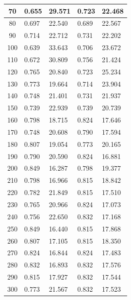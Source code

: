 \documentclass{report}
\begin{document}
\begin{minipage}{\textwidth}
\begin{longtable}{|c|l|l|l|l|}
                     70 & 0.655 & 29.571 & 0.723 & 22.468 \\ \hline
                     80 & 0.697 & 22.540 & 0.689 & 22.567 \\ \hline
                     90 & 0.714 & 22.712 & 0.731 & 22.202 \\ \hline
                     100 & 0.639 & 33.643 & 0.706 & 23.672 \\ \hline
                     110 & 0.672 & 30.809 & 0.756 & 21.424 \\ \hline
                     120 & 0.765 & 20.840 & 0.723 & 25.234 \\ \hline
                     130 & 0.773 & 19.664 & 0.714 & 23.904 \\ \hline
                     140 & 0.748 & 21.401 & 0.731 & 21.937 \\ \hline
                     150 & 0.739 & 22.939 & 0.739 & 20.739 \\ \hline
                     160 & 0.798 & 18.715 & 0.824 & 17.646 \\ \hline
                     170 & 0.748 & 20.608 & 0.790 & 17.594 \\ \hline
                     180 & 0.807 & 19.054 & 0.773 & 20.165 \\ \hline
                     190 & 0.790 & 20.590 & 0.824 & 16.881 \\ \hline
                     200 & 0.849 & 16.287 & 0.798 & 19.377 \\ \hline
                     210 & 0.798 & 16.966 & 0.815 & 18.842 \\ \hline
                     220 & 0.782 & 21.849 & 0.815 & 17.510 \\ \hline
                     230 & 0.765 & 20.966 & 0.824 & 17.073 \\ \hline
                     240 & 0.756 & 22.650 & 0.832 & 17.168 \\ \hline
                     250 & 0.849 & 16.440 & 0.815 & 17.868 \\ \hline
                     260 & 0.807 & 17.105 & 0.815 & 18.350 \\ \hline
                     270 & 0.824 & 16.844 & 0.824 & 17.483 \\ \hline
                     280 & 0.832 & 16.893 & 0.832 & 17.576 \\ \hline
                     290 & 0.815 & 17.927 & 0.832 & 17.544 \\ \hline
                     300 & 0.773 & 21.567 & 0.832 & 17.523 \\ \hline

\end{longtable}
\end{minipage}
\end{document}
